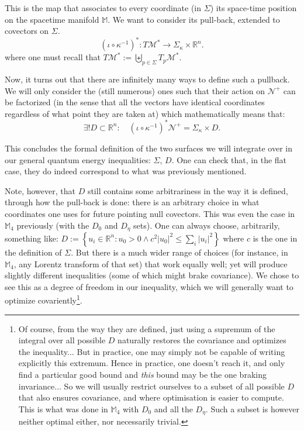 \documentclass[a4paper,11pt]{article}
\numberwithin{equation}{section}
\theoremstyle{definition}
\begin{document}
This is the map that associates to every coordinate (in $\Sigma$) its space-time position on the spacetime manifold $\mathbb{M}$. We want to consider its pull-back, extended to covectors on $\Sigma$.
\begin{equation}
(\iota \circ \kappa^{-1})^*: T\mathcal{M}^* \to \Sigma_\kappa \times \mathbb{R}^n.
\end{equation}
where one must recall that $T\mathcal{M}^* := \underset{p\in \Sigma}{ \biguplus} T_p\mathcal{M}^*$.

Now, it turns out that there are infinitely many ways to define such a pullback. We will only consider the (still numerous) ones such that their action on $\mathcal{N}^+$ can be factorized (in the sense that all the vectors have identical coordinates regardless of what point they are taken at) which mathematically means that:
\begin{equation}
\exists ! D \subset \mathbb{R}^n : \quad (\iota \circ \kappa^{-1})^*\mathcal{N}^+ =  \Sigma_\kappa \times D.
\end{equation}

This concludes the formal definition of the two surfaces we will integrate over in our general quantum energy inequalities: $\Sigma$, $D$. One can check that, in the flat case, they do indeed correspond to what was previously mentioned.

Note, however, that $D$ still contains some arbitrariness in the way it is defined, through how the pull-back is done: there is an arbitrary choice in what coordinates one uses for future pointing null covectors. This was even the case in $\mathbb{M}_4$ previously (with the $D_0$ and $D_\eta$ sets). One can always choose, arbitrarily, something like:
$D:= \left\{u_i \in \mathbb{R}^n : u_0 >0 \wedge c^2 |u_0|^2 \leq \sum_i |u_i|^2 \right\}$
where $c$ is the one in the definition of $\Sigma$. But there is a much wider range of choices (for instance, in $\mathbb{M}_4$, any Lorentz transform of that set) that work equally well; yet will produce slightly different inequalities (some of which might brake covariance). We chose to see this as a degree of freedom in our inequality, which we will generally want to optimize covariently\footnote{Of course, from the way they are defined, just using a supremum of the integral over all possible $D$ naturally restores the covariance and optimizes the inequality... But in practice, one may simply not be capable of writing explicitly this extremum. Hence in practice, one doesn't reach it, and only find a particular good bound and \emph{this} bound may be the one braking invariance... So we will usually restrict ourselves to a subset of all possible $D$ that also ensures covariance, and where optimisation is easier to compute. This is what was done in $\mathbb{M}_4$ with $D_0$ and all the $D_\eta$. Such a subset is however neither optimal either, nor necessarily trivial.}.
\end{document}
